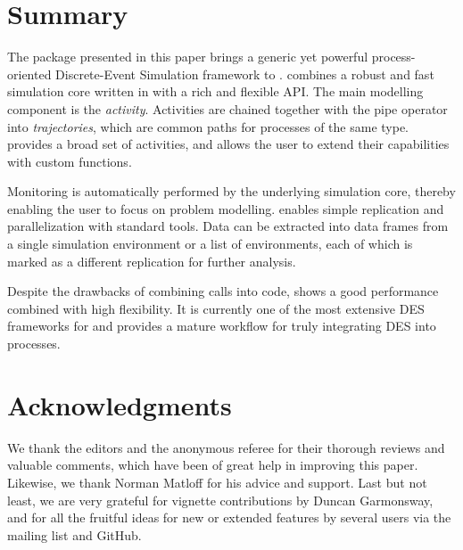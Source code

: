 \documentclass[
  nojss]{jss}
\begin{document}
\section{Summary}\label{summary}

The  package presented in this paper brings a generic yet
powerful process-oriented Discrete-Event Simulation framework to
.  combines a robust and fast simulation core
written in  with a rich and flexible  API. The
main modelling component is the \emph{activity}. Activities are chained
together with the pipe operator into \emph{trajectories}, which are
common paths for processes of the same type.  provides a
broad set of activities, and allows the user to extend their
capabilities with custom  functions.

Monitoring is automatically performed by the underlying simulation core,
thereby enabling the user to focus on problem modelling. 
enables simple replication and parallelization with standard
 tools. Data can be extracted into  data frames
from a single simulation environment or a list of environments, each of
which is marked as a different replication for further analysis.

Despite the drawbacks of combining  calls into
 code,  shows a good performance combined with
high flexibility. It is currently one of the most extensive DES
frameworks for  and provides a mature workflow for truly
integrating DES into  processes.

\section*{Acknowledgments}

We thank the editors and the anonymous referee for their thorough
reviews and valuable comments, which have been of great help in
improving this paper. Likewise, we thank Norman Matloff for his advice
and support. Last but not least, we are very grateful for vignette
contributions by Duncan Garmonsway, and for all the fruitful ideas for
new or extended features by several users via the 
mailing list and GitHub.

\renewcommand\refname{References}

\end{document}
